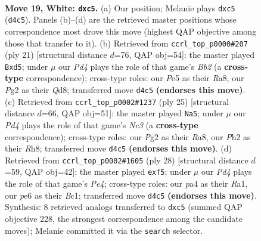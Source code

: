 \documentclass[11pt]{article}
\begin{document}
\begin{figure}[p]
\label{fig:thought-m34}
\end{figure}

\clearpage

\begin{figure}[p]\centering
\begin{subfigure}{0.46\textwidth}\centering
\resizebox{\linewidth}{!}{%
\newchessgame
\chessboard[
  setfen={1nb1qrk1/1r2nppp/1p2p3/1NppP3/p2P1P2/6K1/PPP3PP/R2Q1BNR w - - 0 19},
  showmover=false,
  pgfstyle=straightmove, color=movearrow, markmove={d4-c5}
]}
\caption{}
\end{subfigure}\hfill
\begin{subfigure}{0.46\textwidth}\centering
\resizebox{\linewidth}{!}{%
\newchessgame
\chessboard[
  setfen={r2qkb1r/1b1npppp/p2p4/3P4/NppP4/2P5/PP1N1PPP/R1BQ1RK1 b kq - 2 11},
  showmover=false,
  pgfstyle=straightmove, color=movearrow, markmove={b7-d5}
]}
\caption{}
\end{subfigure}
\\[4pt]
\begin{subfigure}{0.46\textwidth}\centering
\resizebox{\linewidth}{!}{%
\newchessgame
\chessboard[
  setfen={r3k2r/pbqp1ppp/1pn1p3/2p5/2PPP3/P1PB1N2/4QPPP/R4RK1 b kq - 0 13},
  showmover=false,
  pgfstyle=straightmove, color=movearrow, markmove={c6-a5}
]}
\caption{}
\end{subfigure}\hfill
\begin{subfigure}{0.46\textwidth}\centering
\resizebox{\linewidth}{!}{%
\newchessgame
\chessboard[
  setfen={r1bq1rk1/pp4pn/3p2np/2pPpp2/P1P1P3/2PB4/5PPP/R1BQRNK1 w - - 0 15},
  showmover=false,
  pgfstyle=straightmove, color=movearrow, markmove={e4-f5}
]}
\caption{}
\end{subfigure}
\caption{\textbf{Move 19, White: \texttt{dxc5}.} (a) Our position; Melanie plays \texttt{dxc5} (\texttt{d4c5}). Panels (b)--(d) are the retrieved master positions whose correspondence most drove this move (highest QAP objective among those that transfer to it). (b) Retrieved from \texttt{ccrl\_top\_p0000\#207} (ply 21) [structural distance $d$=76, QAP obj=54]: the master played \texttt{Bxd5}; under $\mu$ our \emph{Pd4} plays the role of that game's \emph{Bb2} (a \textbf{cross-type} correspondence); cross-type roles: our \emph{P}e5 as their \emph{R}a8, our \emph{P}g2 as their \emph{Q}d8; transferred move \texttt{d4c5} \textbf{(endorses this move)}. (c) Retrieved from \texttt{ccrl\_top\_p0002\#1237} (ply 25) [structural distance $d$=66, QAP obj=51]: the master played \texttt{Na5}; under $\mu$ our \emph{Pd4} plays the role of that game's \emph{Nc3} (a \textbf{cross-type} correspondence); cross-type roles: our \emph{P}g2 as their \emph{R}a8, our \emph{P}h2 as their \emph{R}h8; transferred move \texttt{d4c5} \textbf{(endorses this move)}. (d) Retrieved from \texttt{ccrl\_top\_p0002\#1605} (ply 28) [structural distance $d$=59, QAP obj=42]: the master played \texttt{exf5}; under $\mu$ our \emph{Pd4} plays the role of that game's \emph{Pe4}; cross-type roles: our \emph{p}a4 as their \emph{R}a1, our \emph{p}e6 as their \emph{B}c1; transferred move \texttt{d4c5} \textbf{(endorses this move)}. Synthesis: 8 retrieved analogs transferred to \texttt{dxc5} (summed QAP objective 228, the strongest correspondence among the candidate moves); Melanie committed it via the \texttt{search} selector.}

\end{figure}
\end{document}
